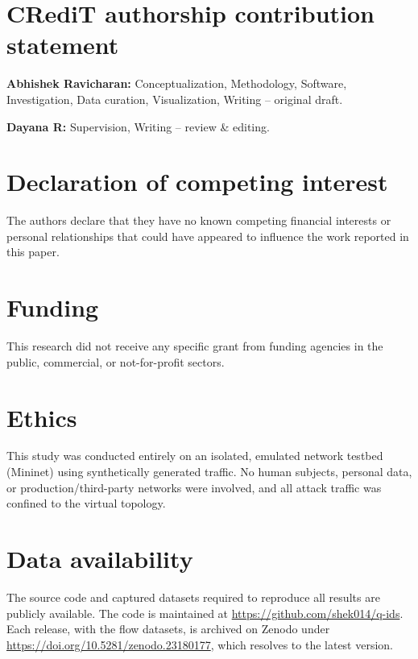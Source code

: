 \documentclass[preprint,12pt]{elsarticle}
\begin{document}
\section*{CRediT authorship contribution statement}
\textbf{Abhishek Ravicharan:} Conceptualization, Methodology, Software, Investigation,
Data curation, Visualization, Writing -- original draft.

\textbf{{Dayana R}:} Supervision, Writing -- review \& editing.

\section*{Declaration of competing interest}
The authors declare that they have no known competing financial interests or personal relationships
that could have appeared to influence the work reported in this paper.

\section*{Funding}
This research did not receive any specific grant from funding agencies in the public, commercial, or
not-for-profit sectors.

\section*{Ethics}
This study was conducted entirely on an isolated, emulated network testbed (Mininet) using
synthetically generated traffic. No human subjects, personal data, or production/third-party networks
were involved, and all attack traffic was confined to the virtual topology.

\section*{Data availability}
The source code and captured datasets required to reproduce all results are publicly available.
The code is maintained at \url{https://github.com/shek014/q-ids}. Each release, with the flow
datasets, is archived on Zenodo under \url{https://doi.org/10.5281/zenodo.23180177}, which resolves to
the latest version.



\end{document}
